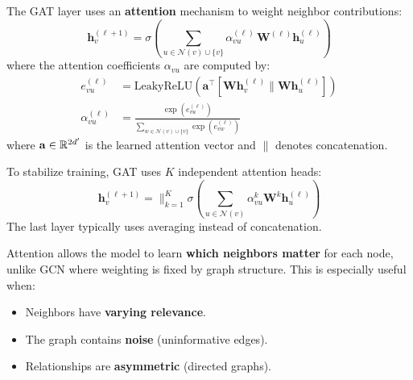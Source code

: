 \begin{definition}
The GAT layer uses an \textbf{attention} mechanism to weight neighbor
contributions:
\[
    \mathbf{h}_v^{(\ell+1)} = \sigma\!\left(\sum_{u \in \mathcal{N}(v) \cup \{v\}}
    \alpha_{vu}^{(\ell)}\, \mathbf{W}^{(\ell)} \mathbf{h}_u^{(\ell)}\right)
\]
where the attention coefficients $\alpha_{vu}$ are computed by:
\begin{align}
    e_{vu}^{(\ell)} &= \text{LeakyReLU}\!\left(\mathbf{a}^{\top}\!
    \left[\mathbf{W}\mathbf{h}_v^{(\ell)} \| \mathbf{W}\mathbf{h}_u^{(\ell)}\right]\right) \\
    \alpha_{vu}^{(\ell)} &= \frac{\exp(e_{vu}^{(\ell)})}{\sum_{w \in \mathcal{N}(v) \cup \{v\}}
    \exp(e_{vw}^{(\ell)})}
\end{align}
where $\mathbf{a} \in \mathbb{R}^{2d'}$ is the learned attention vector and $\|$
denotes concatenation.
\end{definition}

\begin{remark}
To stabilize training, GAT uses $K$ independent attention heads:
\[
    \mathbf{h}_v^{(\ell+1)} = \Big\|_{k=1}^{K} \sigma\!\left(\sum_{u \in \mathcal{N}(v)}
    \alpha_{vu}^{k} \mathbf{W}^k \mathbf{h}_u^{(\ell)}\right)
\]
The last layer typically uses averaging instead of concatenation.
\end{remark}

\begin{intuition}[title=\textbf{Why attention?}]
Attention allows the model to learn \textbf{which neighbors matter} for each
node, unlike GCN where weighting is fixed by graph structure. This is
especially useful when:
\begin{itemize}
    \item Neighbors have \textbf{varying relevance}.
    \item The graph contains \textbf{noise} (uninformative edges).
    \item Relationships are \textbf{asymmetric} (directed graphs).
\end{itemize}
\end{intuition}

